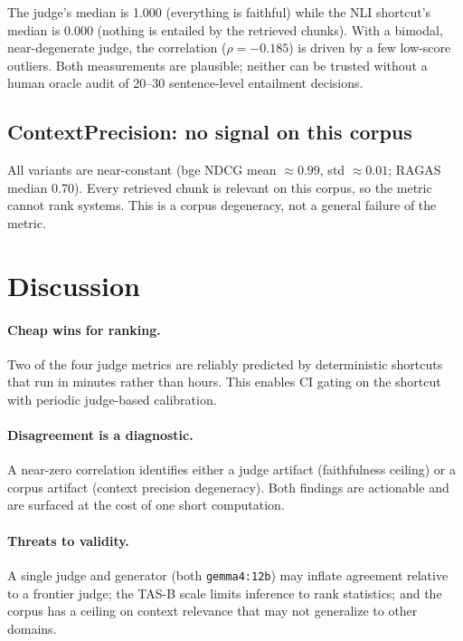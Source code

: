 \documentclass[11pt]{article}
\begin{document}
The judge's median is 1.000 (everything is faithful) while the NLI shortcut's
median is 0.000 (nothing is entailed by the retrieved chunks). With a
bimodal, near-degenerate judge, the correlation ($\rho=-0.185$) is driven by a
few low-score outliers. Both measurements are plausible; neither can be
trusted without a human oracle audit of 20--30 sentence-level entailment
decisions.

\subsection{ContextPrecision: no signal on this corpus}\label{sec:cp}

All variants are near-constant (bge NDCG mean $\approx 0.99$, std $\approx
0.01$; RAGAS median 0.70). Every retrieved chunk is relevant on this corpus,
so the metric cannot rank systems. This is a corpus degeneracy, not a general
failure of the metric.

\section{Discussion}\label{sec:discussion}

\paragraph{Cheap wins for ranking.} Two of the four judge metrics are reliably
predicted by deterministic shortcuts that run in minutes rather than hours.
This enables CI gating on the shortcut with periodic judge-based calibration.

\paragraph{Disagreement is a diagnostic.} A near-zero correlation identifies
either a judge artifact (faithfulness ceiling) or a corpus artifact
(context precision degeneracy). Both findings are actionable and are surfaced
at the cost of one short computation.

\paragraph{Threats to validity.} A single judge and generator (both
\texttt{gemma4:12b}) may inflate agreement relative to a frontier judge; the
TAS-B scale limits inference to rank statistics; and the corpus has a ceiling
on context relevance that may not generalize to other domains.
\end{document}
